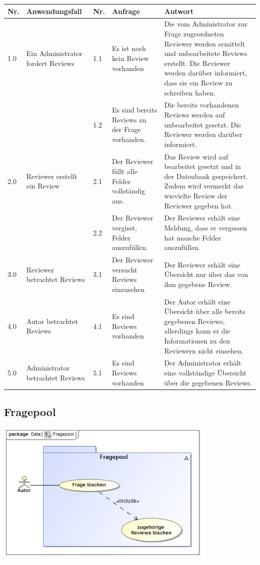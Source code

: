 \documentclass[a4paper]{scrreprt}
\begin{document}
\begin{tabular}{|p{0.5cm}|p{3cm}|p{0.5cm}|p{4cm}|p{4.5cm}|}\hline
Nr. & Anwendungsfall & Nr. & Anfrage & Antwort\\\hline
1.0 & Ein Administrator fordert Reviews & 1.1 & Es ist noch kein Review vorhanden & Die vom Administrator zur Frage zugeordneten Reviewer werden ermittelt und unbearbeitete Reviews erstellt. Die Reviewer werden darüber informiert, dass sie ein Review zu schreiben haben.\\\hline
&&1.2 & Es sind bereits Reviews zu der Frage vorhanden. & Die bereits vorhandenen Reviews werden auf unbearbeitet gesetzt. Die Reviewer werden darüber informiert.\\\hline
2.0 & Reviewer erstellt ein Review & 2.1 & Der Reviewer füllt alle Felder vollständig aus. & Das Review wird auf bearbeitet gesetzt und in der Datenbank gespeichert. Zudem wird vermerkt das wievielte Review der Reviewer gegeben hat.\\\hline
&&2.2 & Der Reviewer vergisst, Felder auszufüllen. & Der Reviewer erhält eine Meldung, dass er vergessen hat manche Felder auszufüllen. \\\hline
3.0 & Reviewer betrachtet Reviews & 3.1 & Der Reviewer versucht Reviews einzusehen & Der Reviewer erhält eine Übersicht nur über das von ihm gegebene Review. \\\hline
4.0 & Autor betrachtet Reviews & 4.1 & Es sind Reviews vorhanden & Der Autor erhält eine Übersicht über alle bereits gegebenen Reviews, allerdings kann er die Informationen zu den Reviewern nicht einsehen. \\\hline
5.0 & Administrator betrachtet Reviews & 5.1 & Es sind Reviews vorhanden & Der Administrator erhält eine vollständige Übersicht über die gegebenen Reviews. \\\hline
\end{tabular}

\newpage

\subsection{Fragepool}

\includegraphics[width=0.8\textwidth]{Use_Case_Diagram__Fragepool.png}
\label{Fragepool bearbeiten}
\end{document}
